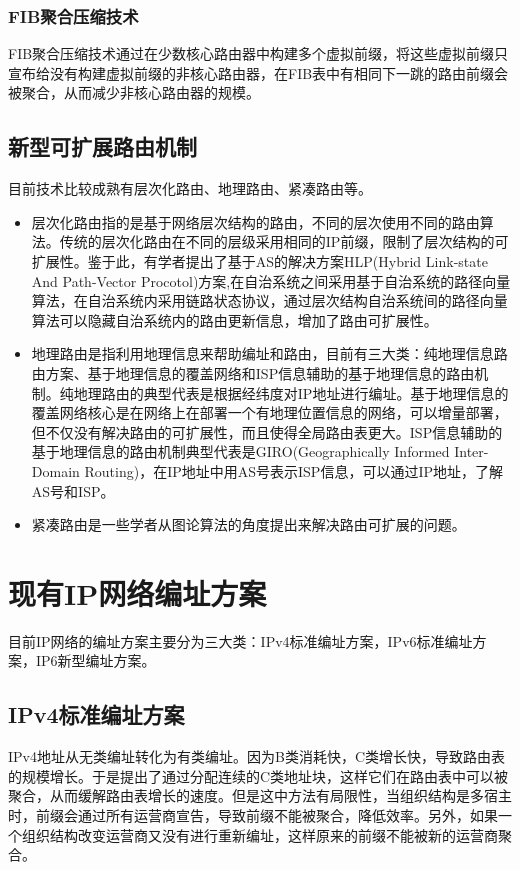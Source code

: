 \subsubsection{FIB聚合压缩技术}
FIB聚合压缩技术通过在少数核心路由器中构建多个虚拟前缀，将这些虚拟前缀只宣布给没有构建虚拟前缀的非核心路由器，在FIB表中有相同下一跳的路由前缀会被聚合，从而减少非核心路由器的规模。
\subsection{新型可扩展路由机制}
目前技术比较成熟有层次化路由、地理路由、紧凑路由等。
\begin{itemize}
\item 层次化路由指的是基于网络层次结构的路由，不同的层次使用不同的路由算法。传统的层次化路由在不同的层级采用相同的IP前缀，限制了层次结构的可扩展性。鉴于此，有学者提出了基于AS的解决方案HLP(Hybrid Link-state And Path-Vector Procotol)方案\cite{HLP},在自治系统之间采用基于自治系统的路径向量算法，在自治系统内采用链路状态协议，通过层次结构自治系统间的路径向量算法可以隐藏自治系统内的路由更新信息，增加了路由可扩展性。
\item 地理路由是指利用地理信息来帮助编址和路由，目前有三大类：纯地理信息路由方案、基于地理信息的覆盖网络和ISP信息辅助的基于地理信息的路由机制。纯地理路由的典型代表是根据经纬度对IP地址进行编址。基于地理信息的覆盖网络核心是在网络上在部署一个有地理位置信息的网络，可以增量部署，但不仅没有解决路由的可扩展性，而且使得全局路由表更大。ISP信息辅助的基于地理信息的路由机制典型代表是GIRO(Geographically Informed Inter-Domain Routing)，在IP地址中用AS号表示ISP信息，可以通过IP地址，了解AS号和ISP。
\item 紧凑路由\cite{CompactRouting}是一些学者从图论算法的角度提出来解决路由可扩展的问题。
\end{itemize}

\section{现有IP网络编址方案}
目前IP网络的编址方案主要分为三大类：IPv4标准编址方案，IPv6标准编址方案，IP6新型编址方案。

\subsection{IPv4标准编址方案}
IPv4地址从无类编址转化为有类编址。因为B类消耗快，C类增长快，导致路由表的规模增长。于是提出了通过分配连续的C类地址块，这样它们在路由表中可以被聚合，从而缓解路由表增长的速度。但是这中方法有局限性，当组织结构是多宿主时，前缀会通过所有运营商宣告，导致前缀不能被聚合，降低效率。另外，如果一个组织结构改变运营商又没有进行重新编址，这样原来的前缀不能被新的运营商聚合。

